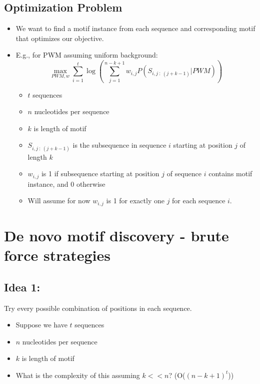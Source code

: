 \documentclass[10pt]{article}
\begin{document}
\subsection*{Optimization Problem}
\begin{itemize}
	\item We want to find a motif instance from each sequence and corresponding motif that optimizes our objective.
	\item E.g., for PWM assuming uniform background:
	\[\max_{PWM, w} \sum_{i = 1}^t \log \left( \sum_{j = 1}^{n - k + 1} w_{i, j} P(S_{i, j\::\: (j + k - 1)} | PWM)\right)\]
    \begin{itemize}
        \item $t$ sequences
        \item $n$ nucleotides per sequence
        \item $k$ is length of motif
        \item $S_{i, j \::\: (j + k - 1)}$ is the subsequence in sequence $i$ starting at position $j$ of length $k$
        \item $w_{i, j}$ is 1 if subsequence starting at position $j$ of sequence $i$ contains motif instance, and 0 otherwise
        \item Will assume for now $w_{i, j}$ is 1 for exactly one $j$ for each sequence $i$.
    \end{itemize}
\end{itemize}

\section*{De novo motif discovery - brute force strategies}
\subsection*{Idea 1:}
Try every possible combination of positions in each sequence.
\begin{itemize}
	\item Suppose we have $t$ sequences
	\item $n$ nucleotides per sequence
	\item $k$ is length of motif
	\item What is the complexity of this assuming $k << n$?  (O($(n - k + 1)^t$)) 
\end{itemize}
\end{document}
